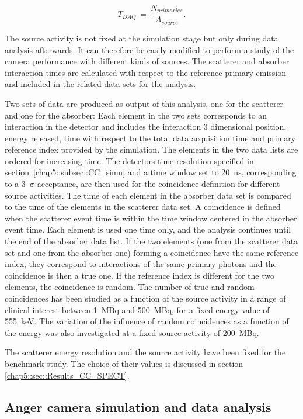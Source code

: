 \begin{equation}
T_{DAQ}\, = \,\frac{N_{primaries}}{A_{source}}.
\label{chap5::eq::DAQ_time}
\end{equation} 

The source activity is not fixed at the simulation stage but only during data analysis afterwards. It can therefore be easily modified to perform a study of the camera performance with different kinds of sources. The scatterer and absorber interaction times are calculated with respect to the reference primary emission and included in the related data sets for the analysis.

Two sets of data are produced as output of this analysis, one for the scatterer and one for the absorber: Each element in the two sets corresponds to an interaction in the detector and includes the interaction 3 dimensional position, energy released, time with respect to the total data acquisition time and primary reference index provided by the simulation. The elements in the two data lists are ordered for increasing time. The detectors time resolution specified in section~\ref{chap5::subsec::CC_simu} and a time window set to 20~ns, corresponding to a 3~$\mathrm{\sigma}$ acceptance, are then used for the coincidence definition for different source activities. The time of each element in the absorber data set is compared to the time of the elements in the scatterer data set. A coincidence is defined when the scatterer event time is within the time window centered in the absorber event time. Each element is used one time only, and the analysis continues until the end of the absorber data list. If the two  elements (one from the scatterer data set and one from the absorber one) forming a coincidence have the same reference index, they correspond to interactions of the same primary photons and the coincidence is then a true one. If the reference index is different for the two elements, the coincidence is random. The number of true and random coincidences has been studied as a function of the source activity in a range of clinical interest between 1~MBq and 500~MBq, for a fixed energy value of 555~keV. The variation of the influence of random coincidences as a function of the energy was also investigated at a fixed source activity of 200~MBq.

The scatterer energy resolution and the source activity have been fixed for the benchmark study. The choice of their values is discussed in section \ref{chap5::sec::Results_CC_SPECT}. 

\subsection{Anger camera simulation and data analysis}\label{chap5::subsec::Anger_descr}

